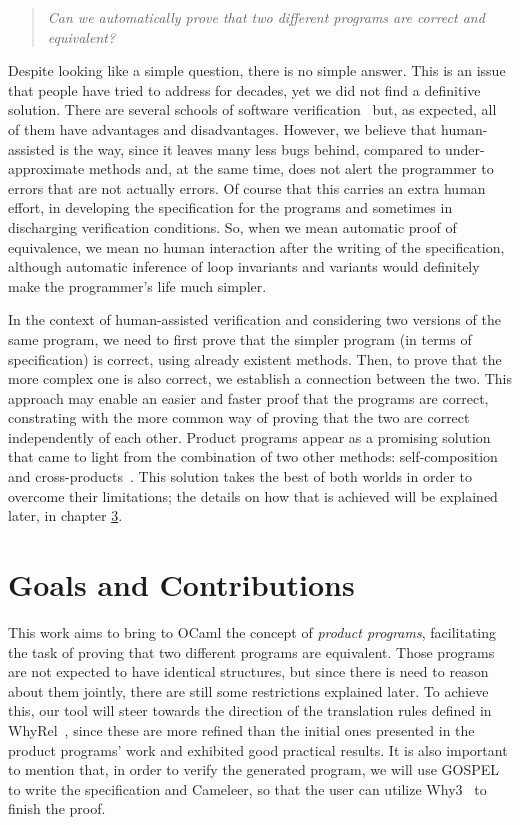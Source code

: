 \begin{quote}
    \centering
    \emph{Can we automatically prove that two different programs are correct and equivalent?}
\end{quote}

Despite looking like a simple question, there is no simple answer.
This is an issue that people have tried to address for decades, yet we did not find a definitive solution.
There are several schools of software verification~\cite{DBLP:conf/fm/BrainP24} but, as expected, all of them have advantages and disadvantages.
However, we believe that human-assisted is the way, since it leaves many less bugs behind, compared to under-approximate methods and, at the same time, does not alert the programmer to errors that are not actually errors.
Of course that this carries an extra human effort, in developing the specification for the programs and sometimes in discharging verification conditions.
So, when we mean automatic proof of equivalence, we mean no human interaction after the writing of the specification, although automatic inference of loop invariants and variants would definitely make the programmer's life much simpler.

In the context of human-assisted verification and considering two versions of the same program, we need to first prove that the simpler program (in terms of specification) is correct, using already existent methods.
Then, to prove that the more complex one is also correct, we establish a connection between the two.
This approach may enable an easier and faster proof that the programs are correct, constrating with the more common way of proving that the two are correct independently of each other. 
Product programs appear as a promising solution that came to light from the combination of two other methods: self-composition~\cite{DBLP:conf/csfw/BartheDR04} and cross-products~\cite{DBLP:conf/fm/ZaksP08}.
This solution takes the best of both worlds in order to overcome their limitations; the details on how that is achieved will be explained later, in chapter \hyperref[cha:state_of_the_art]{3}.


\section{Goals and Contributions}

This work aims to bring to OCaml the concept of \emph{product programs}, facilitating the task of proving that two different programs are equivalent.
Those programs are not expected to have identical structures, but since there is need to reason about them jointly, there are still some restrictions explained later.
To achieve this, our tool will steer towards the direction of the translation rules defined in WhyRel~\cite{whyrel}, since these are more refined than the initial ones presented in the product programs' work and exhibited good practical results.
It is also important to mention that, in order to verify the generated program, we will use GOSPEL to write the specification and Cameleer, so that the user can utilize Why3~\cite{why3} to finish the proof.

